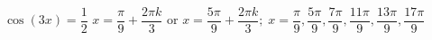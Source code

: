 { $\cos \left( 3x \right) = \dfrac{1}{2}$ }
{ $x = \dfrac{\pi}{9} + \dfrac{2\pi k}{3}$ or $x = \dfrac{5\pi}{9} + \dfrac{2\pi k}{3}; \; x = \dfrac{\pi}{9}, \dfrac{5\pi}{9}, \dfrac{7\pi}{9}, \dfrac{11\pi}{9}, \dfrac{13\pi}{9}, \dfrac{17\pi}{9}$}
